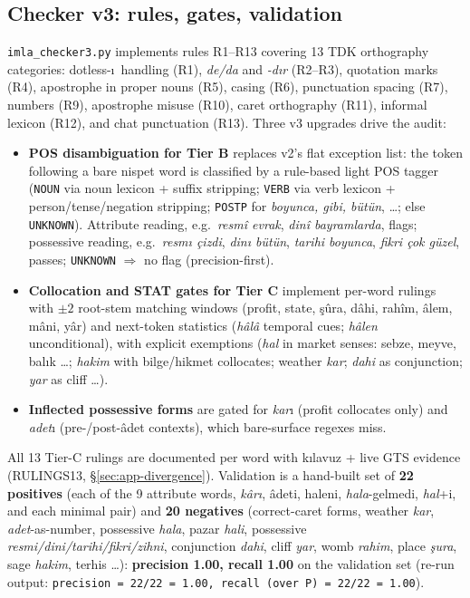 \documentclass[11pt]{article}
\begin{document}
\subsection{Checker v3: rules, gates, validation}

\texttt{imla\_checker3.py} implements rules R1--R13 covering 13 TDK orthography categories: dotless-\i\ handling (R1), \emph{de/da} and \emph{-d{\i}r} (R2--R3), quotation marks (R4), apostrophe in proper nouns (R5), casing (R6), punctuation spacing (R7), numbers (R9), apostrophe misuse (R10), caret orthography (R11), informal lexicon (R12), and chat punctuation (R13). Three v3 upgrades drive the audit:

\begin{itemize}
\item \textbf{POS disambiguation for Tier B} replaces v2's flat exception list: the token following a bare nispet word is classified by a rule-based light POS tagger (\texttt{NOUN} via noun lexicon + suffix stripping; \texttt{VERB} via verb lexicon + person/tense/negation stripping; \texttt{POSTP} for \emph{boyunca, gibi, b{\"u}t{\"u}n}, \ldots; else \texttt{UNKNOWN}). Attribute reading, e.g.\ \emph{resm{\^i} evrak}, \emph{din{\^i} bayramlarda}, flags; possessive reading, e.g.\ \emph{resm{\i} {\c c}izdi}, \emph{din{\i} b{\"u}t{\"u}n}, \emph{tarihi boyunca}, \emph{fikri {\c c}ok g{\"u}zel}, passes; \texttt{UNKNOWN} $\Rightarrow$ no flag (precision-first).
\item \textbf{Collocation and STAT gates for Tier C} implement per-word rulings with $\pm2$ root-stem matching windows (profit, state, {\c s}{\^u}ra, d{\^a}hi, rah{\^i}m, {\^a}lem, m{\^a}ni, y{\^a}r) and next-token statistics (\emph{h{\^a}l{\^a}} temporal cues; \emph{h{\^a}len} unconditional), with explicit exemptions (\emph{hal} in market senses: sebze, meyve, bal{\i}k \ldots; \emph{hakim} with bilge/hikmet collocates; weather \emph{kar}; \emph{dahi} as conjunction; \emph{yar} as cliff \ldots).
\item \textbf{Inflected possessive forms} are gated for \emph{kar}{\i} (profit collocates only) and \emph{adet}{\i} (pre-/post-{\^a}det contexts), which bare-surface regexes miss.
\end{itemize}

All 13 Tier-C rulings are documented per word with k{\i}lavuz + live GTS evidence (RULINGS13, \S\ref{sec:app-divergence}). Validation is a hand-built set of \textbf{22 positives} (each of the 9 attribute words, \emph{k{\^a}r{\i}}, {\^a}deti, haleni, \emph{hala}-gelmedi, \emph{hal}+i, and each minimal pair) and \textbf{20 negatives} (correct-caret forms, weather \emph{kar}, \emph{adet}-as-number, possessive \emph{hala}, pazar \emph{hali}, possessive \emph{resmi/dini/tarihi/fikri/zihni}, conjunction \emph{dahi}, cliff \emph{yar}, womb \emph{rahim}, place \emph{{\c s}ura}, sage \emph{hakim}, terhis \ldots): \textbf{precision 1.00, recall 1.00} on the validation set (re-run output: \texttt{precision = 22/22 = 1.00, recall (over P) = 22/22 = 1.00}).
\end{document}
